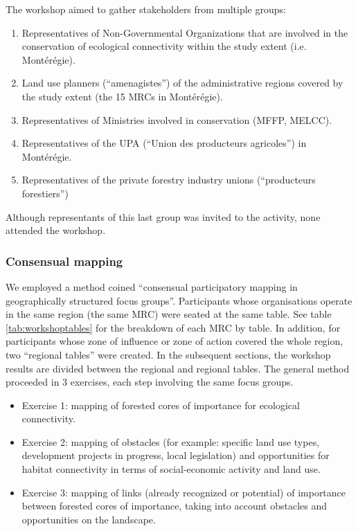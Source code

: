 The workshop aimed to gather stakeholders from multiple groups:
\begin{enumerate}
  \item Representatives of Non-Governmental Organizations that are involved in the conservation of ecological connectivity within the study extent (i.e. Montérégie).
  \item Land use planners (“amenagistes”) of the administrative regions covered by the study extent (the 15 MRCs in Montérégie).
  \item Representatives of Ministries involved in conservation (MFFP, MELCC).
  \item Representatives of the UPA (“Union des producteurs agricoles”) in Montérégie.
  \item Representatives of the private forestry industry unions (“producteurs forestiers”)
\end{enumerate}
Although representants of this last group was invited to the activity, none attended the workshop. \\

\subsubsection{Consensual mapping}

We employed a method coined “consensual participatory mapping in geographically structured focus groups”. Participants whose organisations operate in the same region (the same MRC) were seated at the same table. See table \ref{tab:workshoptables} for the breakdown of each MRC by table. In addition, for participants whose zone of influence or zone of action covered the whole region, two “regional tables” were created. In the subsequent sections, the workshop results are divided between the regional and regional tables.
The general method proceeded in 3 exercises, each step involving the same focus groups.

\begin{itemize}
  \item Exercise 1: mapping of forested cores of importance for ecological connectivity.
  \item Exercise 2: mapping of obstacles (for example: specific land use types, development projects in progress, local legislation) and opportunities for habitat connectivity in terms of social-economic activity and land use.
  \item Exercise 3: mapping of links (already recognized or potential) of importance between forested cores of importance, taking into account obstacles and opportunities on the landscape.
\end{itemize}


